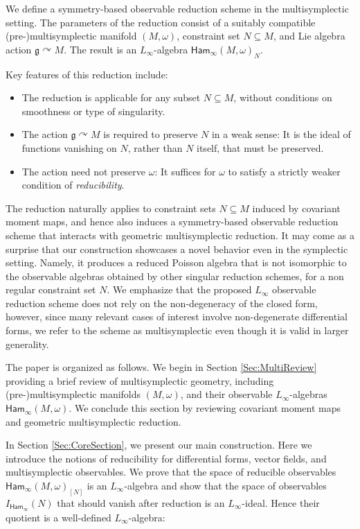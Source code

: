 \documentclass[pdftex]{sigma}
\numberwithin{equation}{section}
\newcommand{\g}{\mathfrak{g}}
\newcommand{\Ham}{\mathsf{Ham}}
\renewcommand{\subset}{\subseteq}
\begin{document}
We define a symmetry-based observable reduction scheme in the multisymplectic setting.
The parameters of the reduction consist of a suitably compatible (pre-)multisymplectic manifold $(M,\omega)$, constraint set $N\subset M$, and Lie algebra action $\g\curvearrowright M$. The result is an $L_\infty$-algebra $\Ham_\infty(M,\omega)_N$.

Key features of this reduction include:
\begin{itemize}\itemsep=0pt
	\item The reduction is applicable for any subset $N\subset M$, without conditions on smoothness or type of singularity.
	\item The action $\g\curvearrowright M$ is required to preserve $N$ in a weak sense: It is the ideal of functions vanishing on $N$, rather than $N$ itself, that must be preserved.
	\item The action need not preserve $\omega$: It suffices for $\omega$ to satisfy a strictly weaker condition of \emph{reducibility}.
\end{itemize}

The reduction naturally applies to constraint sets $N\subset M$ induced by covariant moment maps, and hence also induces a symmetry-based observable reduction scheme that interacts with geometric multisymplectic reduction.
It may come as a surprise that our construction showcases a novel behavior even in the symplectic setting. Namely, it produces a reduced Poisson algebra that is not isomorphic to the observable algebras obtained by other singular reduction schemes, for a non regular constraint set $N$.
%
We emphasize that the proposed $L_\infty$ observable reduction scheme does not rely on the non-degeneracy of the closed form,
however, since many relevant cases of interest involve non-degenerate differential forms, we refer to the scheme as multisymplectic even though it is valid in larger generality.

The paper is organized as follows.
We begin in Section \ref{Sec:MultiReview} providing a brief review of multisymplectic geometry, including (pre-)multisymplectic manifolds $(M,\omega)$, and their observable $L_\infty$-algebras $\Ham_\infty(M,\omega)$. We conclude this section by reviewing covariant moment maps and geometric multisymplectic reduction.

In Section \ref{Sec:CoreSection}, we present our main construction. Here we introduce the notions of reducibility for differential forms, vector fields, and multisymplectic observables. We prove that the space of reducible observables ${\Ham_\infty(M,\omega)_{[N]}}$ is an $L_\infty$-algebra and show that the space of observables $I_{\Ham_\infty}(N)$ that should vanish after reduction is an $L_\infty$-ideal. Hence their quotient is a well-defined $L_\infty$-algebra:
\end{document}

